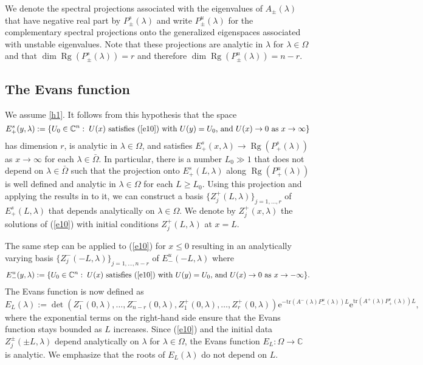 \documentclass[10pt]{article}
\numberwithin{equation}{section}
\def\Rg{\mathop\mathrm{Rg}\nolimits}
\newcommand{\C}{\mathbb{C}}
\newcommand{\rme}{\mathrm{e}}
\begin{document}
We denote the spectral projections associated with the eigenvalues of $A_\pm(\lambda)$ that have negative real part by $P^s_\pm(\lambda)$ and write $P^u_\pm(\lambda)$ for the complementary spectral projections onto the generalized eigenspaces associated with unstable eigenvalues. Note that these projections are analytic in $\lambda$ for $\lambda\in\Omega$ and that $\dim \Rg(P^s_\pm(\lambda))=r$ and therefore $\dim \Rg(P^u_\pm(\lambda))=n-r$.


\subsection{The Evans function}\label{s2.1}

We assume \ref{h1}. It follows from this hypothesis that the space
\[
E^s_+(y,\lambda) := \{ U_0\in\C^n:\; U(x) \mbox{ satisfies (\ref{e10}) with } U(y)=U_0 \mbox{, and } U(x)\to0  \mbox{ as }x\to\infty \}
\]
has dimension $r$, is analytic in $\lambda\in\Omega$, and satisfies $E^s_+(x,\lambda)\to\Rg(P^s_+(\lambda))$ as $x\to\infty$ for each $\lambda\in\bar\Omega$. In particular, there is a number $L_0\gg1$ that does not depend on $\lambda\in\bar\Omega$ such that the projection onto $E^s_+(L,\lambda)$ along $\Rg(P^u_+(\lambda))$ is well defined and analytic in $\lambda\in\Omega$ for each $L\geq L_0$. Using this projection and applying the results in \citep[Ch.~II.4.2]{Kato} to it, we can construct a basis $\{Z_j^+(L,\lambda)\}_{j=1,\ldots,r}$ of $E^s_+(L,\lambda)$ that depends analytically on $\lambda\in\Omega$. We denote by $Z_j^+(x,\lambda)$ the solutions of (\ref{e10}) with initial conditions $Z_j^+(L,\lambda)$ at $x=L$.

The same step can be applied to (\ref{e10}) for $x\leq0$ resulting in an analytically varying basis $\{Z_j^-(-L,\lambda)\}_{j=1,\ldots,n-r}$ of $E^u_-(-L,\lambda)$ where
\[
E^u_-(y,\lambda) := \{ U_0\in\C^n:\; U(x) \mbox{ satisfies (\ref{e10}) with } U(y)=U_0 \mbox{, and } U(x)\to0  \mbox{ as }x\to-\infty \}.
\]
The Evans function is now defined as
\begin{equation}\label{e21}
E_L(\lambda) := \det(Z_1^-(0,\lambda),\ldots,Z_{n-r}^-(0,\lambda),Z_1^+(0,\lambda),\ldots,Z_r^+(0,\lambda))
\rme^{-\mathrm{tr}(A^-(\lambda)P^u_-(\lambda))L} \rme^{\mathrm{tr}(A^+(\lambda)P^s_+(\lambda))L},
\end{equation}
where the exponential terms on the right-hand side ensure that the Evans function stays bounded as $L$ increases. Since (\ref{e10}) and the initial data $Z_j^\pm(\pm L,\lambda)$ depend analytically on $\lambda$ for $\lambda\in\Omega$, the Evans function $E_L:\Omega\to\C$ is analytic. We emphasize that the roots of $E_L(\lambda)$ do not depend on $L$.
\end{document}
